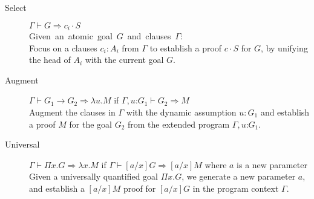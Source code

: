 \documentclass{llncs}
\newcommand{\fighead}{\hrule\vspace{1.5ex}}
\newcommand{\vd}{\vdash}
\newcommand{\arrow}{\rightarrow}
\newcommand{\oftp}{\mathord{:}}
\begin{document}

\begin{small}
\begin{description}
\item[Select] $\Gamma \vd  G \Rightarrow c_i \cdot S$ \\
    \mbox{Given an atomic goal $G$ and clauses $\Gamma$:}\hfill\\
     Focus on a clauses $c_i : A_i$ from $\Gamma$ to establish a proof
     $c\cdot S$ for $G$, by unifying the head of $A_i$ with the current
     goal $G$. 

\item[Augment] $\Gamma \vd  G_1 \arrow G_2 \Rightarrow \lambda u. M$ if $\Gamma,
  u\oftp G_1 \vd G_2 \Rightarrow M$ \\
Augment the clauses in $\Gamma$ with the dynamic assumption $u{:} G_1$ and
establish a proof $M$ for the goal $G_2$ from the extended program
$\Gamma, u \oftp G_1$. 
\item[Universal] $\Gamma \vd  \Pi x. G \Rightarrow \lambda x. M$ if $\Gamma \vd
  [a/x]G\Rightarrow [a/x]M$ where $a$ is a new parameter\\
Given a universally quantified goal $\Pi x. G$, we generate a new parameter $a$, and establish a $[a/x]M$ proof  for $[a/x]G$ in the program context $\Gamma$.
\end{description}
\end{small}    
\end{document}
